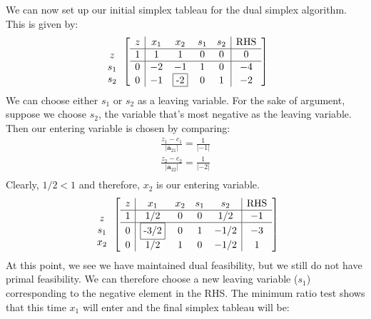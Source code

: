 \begin{example}
We can now set up our initial simplex tableau for the dual simplex algorithm. This is given by:
\begin{displaymath}
\begin{array}{c}
\\
z\\
s_1\\
s_2
\end{array}
\left[
\begin{array}{c|cccc|c}
z& x_1 & x_2 & s_1 & s_2 &\text{RHS}\\
\hline
1 & 1 & 1 & 0 & 0 & 0\\
\hline
0 & -2 & -1 & 1 & 0 & -4\\
0 & -1 & \fbox{-2} & 0 & 1 & -2
\end{array}\right]
\end{displaymath}
We can choose either $s_1$ or $s_2$ as a leaving variable. For the sake of argument, suppose we choose $s_2$, the variable that's most negative as the leaving variable. Then our entering variable is chosen by comparing:
\begin{gather*}
\frac{z_1 - c_1}{|\overline{\mathbf{a}}_{21}|} = \frac{1}{|-1|}\\
\frac{z_2 - c_2}{|\overline{\mathbf{a}}_{22}|} = \frac{1}{|-2|}\\
\end{gather*}
Clearly, $1/2 < 1$ and therefore, $x_2$ is our entering variable.
\begin{displaymath}
\begin{array}{c}
\\
z\\
s_1\\
x_2
\end{array}
\left[
\begin{array}{c|cccc|c}
z& x_1 & x_2 & s_1 & s_2 &\text{RHS}\\
\hline
1 & 1/2 & 0 & 0 & 1/2 & -1\\
\hline
0 & \fbox{-3/2}	& 0 	& 1 	& -1/2 	& -3\\
0 & 1/2 	& 1 	& 0 	& -1/2 	& 1
\end{array}\right]
\end{displaymath}
At this point, we see we have maintained dual feasibility, but we still do not have primal feasibility. We can therefore choose a new leaving variable ($s_1$) corresponding to the negative element in the RHS. The minimum ratio test shows that this time $x_1$ will enter and the final simplex tableau will be:
\begin{displaymath}
\begin{array}{c}

\end{array}
\end{displaymath}
\end{example}
